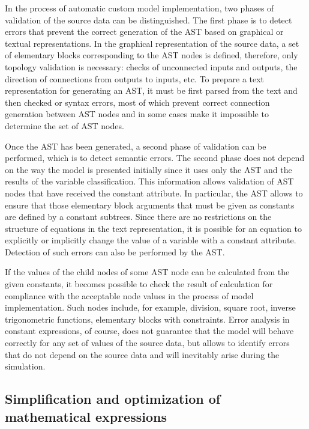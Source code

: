 \documentclass[lettersize,journal]{IEEEtran}
\begin{document}
In the process of automatic custom model implementation, two phases of validation of the source data can be distinguished. 
The first phase is to detect errors that prevent the correct generation of the AST based on graphical or textual representations. 
In the graphical representation of the source data, a set of elementary blocks corresponding to the AST nodes is defined,
therefore, only topology validation is necessary: checks of unconnected inputs and outputs, the direction of connections from
outputs to inputs, etc. To prepare a text representation for generating an AST, it must be first parsed from the text 
and then checked or syntax errors, most of which prevent correct connection generation between AST nodes and in some cases 
make it impossible to determine the set of AST nodes.

Once the AST has been generated, a second phase of validation can be performed, which is to detect semantic errors. The second phase
does not depend on the way the model is presented initially since it uses only the AST and the results of the variable 
classification. This information allows validation of AST nodes that have received the constant attribute. In particular, 
the AST allows to ensure that those elementary block arguments that must be given as constants are defined by a constant subtrees. 
Since there are no restrictions on the structure of equations in the text representation, it is possible for an equation to explicitly
or implicitly change the value of a variable with a constant attribute. Detection of such errors can also be performed 
by the AST.

If the values of the child nodes of some AST node can be calculated from the given constants, it becomes possible to check 
the result of calculation for compliance with the acceptable node values in the process of model implementation. Such nodes 
include, for example, division, square root, inverse trigonometric functions, elementary blocks with constraints. 
Error analysis in constant expressions, of course, does not guarantee that the model will behave correctly for any set of values 
of the source data, but allows to identify errors that do not depend on the source data and will inevitably arise during the simulation.

\subsection {Simplification and optimization of mathematical expressions} \label{sec_simplification}
\end{document}

